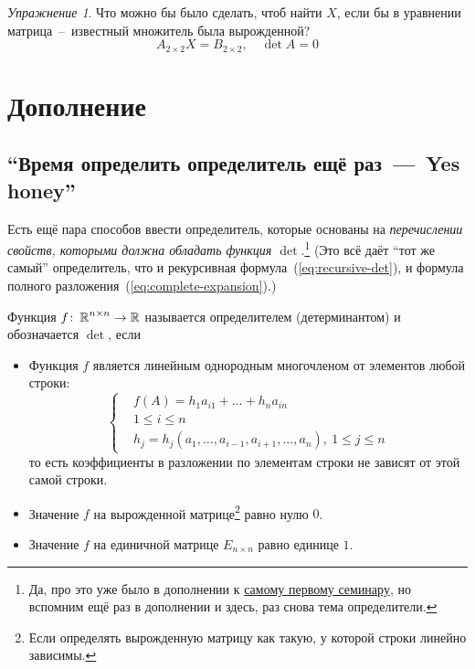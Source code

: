 \documentclass[a4paper,12pt]{article}
\theoremstyle{remark}
\newtheorem*{exercise}{Упражнение}
\begin{document}
\begin{solution}
    \begin{exercise}
      Что можно бы было сделать, чтоб найти $X$, если бы в уравнении матрица~--~известный множитель была вырожденной?
      \[
        A_{2 \times 2} X = B_{2 \times 2},\quad \det A = 0
      \]
    \end{exercise}
  \end{solution}


  \section{Дополнение}
  
  \subsection{``Время определить определитель ещё раз~---~Yes honey''}
  
  Есть ещё пара способов ввести определитель, которые основаны на \emph{перечислении свойств, которыми должна обладать функция $\det$}.\footnote{Да, про это уже было в дополнении к \href{https://github.com/Alvant/GeomeSeminare/tree/master2022/seminars/geome/seminar01}{самому первому семинару}, но вспомним ещё раз в дополнении и здесь, раз снова тема определители.}
  (Это всё даёт ``тот же самый'' определитель, что и рекурсивная формула~(\ref{eq:recursive-det}), и формула полного разложения~(\ref{eq:complete-expansion}).)
  
  \begin{definition}
    Функция $f \colon \operatorname{\mathbb R}^{n \times n} \to \operatorname{\mathbb R}$ называется определителем (детерминантом) и обозначается $\det$, если
    \begin{itemize}
      \item Функция $f$ является линейным однородным многочленом от элементов любой строки:
      \[
        \left\{
          \begin{aligned}
            &f(A) = h_1 a_{i1} + \ldots + h_n a_{in}\\
            &1 \leq i \leq n\\
            &h_j = h_j(a_1, \ldots, a_{i-1}, a_{i+1}, \ldots, a_{n}),\ 1 \leq j \leq n
          \end{aligned}
        \right.
      \]
      то есть коэффициенты в разложении по элементам строки не зависят от этой самой строки.
      
      \item Значение $f$ на вырожденной матрице\footnote{Если определять вырожденную матрицу как такую, у которой строки линейно зависимы.} равно нулю $0$.
      \item Значение $f$ на единичной матрице $E_{n \times n}$ равно единице $1$.
    \end{itemize}
  \end{definition}
  
\end{document}
